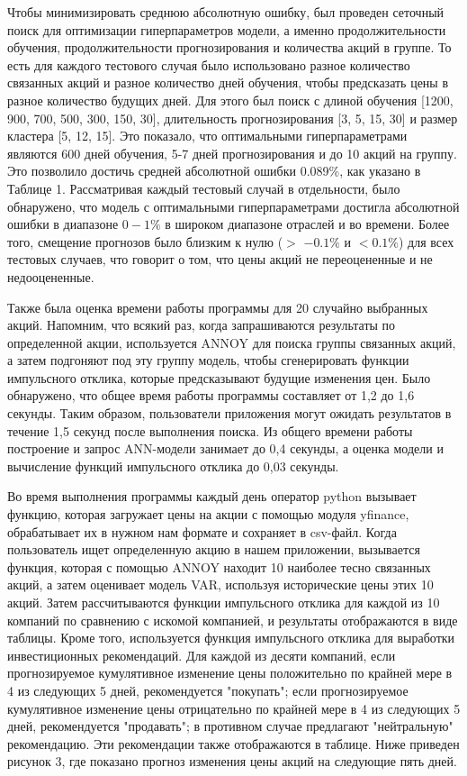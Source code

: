 \documentclass[
]{article}
\begin{document}
Чтобы минимизировать среднюю абсолютную ошибку, был проведен сеточный
поиск для оптимизации гиперпараметров модели, а именно продолжительности
обучения, продолжительности прогнозирования и количества акций в группе.
То есть для каждого тестового случая было использовано разное количество
связанных акций и разное количество дней обучения, чтобы предсказать
цены в разное количество будущих дней. Для этого был поиск с длиной
обучения {[}1200, 900, 700, 500, 300, 150, 30{]}, длительность
прогнозирования {[}3, 5, 15, 30{]} и размер кластера {[}5, 12, 15{]}.
Это показало, что оптимальными гиперпараметрами являются 600 дней
обучения, 5-7 дней прогнозирования и до 10 акций на группу. Это
позволило достичь средней абсолютной ошибки 0.089\%, как указано в
Таблице 1. Рассматривая каждый тестовый случай в отдельности, было
обнаружено, что модель с оптимальными гиперпараметрами достигла
абсолютной ошибки в диапазоне \(0 - 1\%\) в широком диапазоне отраслей и
во времени. Более того, смещение прогнозов было близким к нулю (\(>\)
\(- 0.1\%\) и \(< 0.1\%\)) для всех тестовых случаев, что говорит о том,
что цены акций не переоцененные и не недооцененные.

Также была оценка времени работы программы для 20 случайно выбранных
акций. Напомним, что всякий раз, когда запрашиваются результаты по
определенной акции, используется ANNOY для поиска группы связанных
акций, а затем подгоняют под эту группу модель, чтобы сгенерировать
функции импульсного отклика, которые предсказывают будущие изменения
цен. Было обнаружено, что общее время работы программы составляет от 1,2
до 1,6 секунды. Таким образом, пользователи приложения могут ожидать
результатов в течение 1,5 секунд после выполнения поиска. Из общего
времени работы построение и запрос ANN-модели занимает до 0,4 секунды, а
оценка модели и вычисление функций импульсного отклика до 0,03 секунды.

Во время выполнения программы каждый день оператор python вызывает
функцию, которая загружает цены на акции с помощью модуля yfinance,
обрабатывает их в нужном нам формате и сохраняет в csv-файл. Когда
пользователь ищет определенную акцию в нашем приложении, вызывается
функция, которая с помощью ANNOY находит 10 наиболее тесно связанных
акций, а затем оценивает модель VAR, используя исторические цены этих 10
акций. Затем рассчитываются функции импульсного отклика для каждой из 10
компаний по сравнению с искомой компанией, и результаты отображаются в
виде таблицы. Кроме того, используется функция импульсного отклика для
выработки инвестиционных рекомендаций. Для каждой из десяти компаний,
если прогнозируемое кумулятивное изменение цены положительно по крайней
мере в 4 из следующих 5 дней, рекомендуется "покупать"; если
прогнозируемое кумулятивное изменение цены отрицательно по крайней мере
в 4 из следующих 5 дней, рекомендуется "продавать"; в противном случае
предлагают "нейтральную" рекомендацию. Эти рекомендации также
отображаются в таблице. Ниже приведен рисунок 3, где показано прогноз
изменения цены акций на следующие пять дней.
\end{document}
